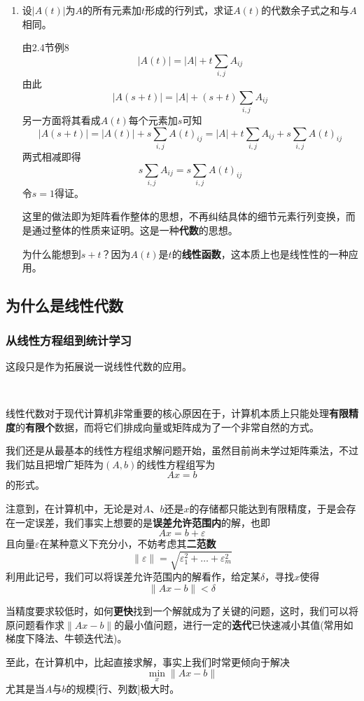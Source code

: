\documentclass[a4paper,UTF8,fontset=windows]{ctexart}
\newcommand*{\note}{\noindent *}
\begin{document}
\begin{enumerate}
    \item{}设$|A(t)|$为$A$的所有元素加$t$形成的行列式，求证$A(t)$的代数余子式之和与$A$相同。
    
    由2.4节例8
    $$|A(t)|=|A|+t\sum_{i,j}A_{ij}$$
    由此
    $$|A(s+t)|=|A|+(s+t)\sum_{i,j}A_{ij}$$
    另一方面将其看成$A(t)$每个元素加$s$可知
    $$|A(s+t)|=|A(t)|+s\sum_{i,j}A(t)_{ij}=|A|+t\sum_{i,j}A_{ij}+s\sum_{i,j}A(t)_{ij}$$
    两式相减即得
    $$s\sum_{i,j}A_{ij}=s\sum_{i,j}A(t)_{ij}$$
    令$s=1$得证。

    \note 这里的做法即为矩阵看作整体的思想，不再纠结具体的细节元素行列变换，而是通过整体的性质来证明。这是一种\textbf{代数}的思想。

    \note 为什么能想到$s+t$？因为$A(t)$是$t$的\textbf{线性函数}，这本质上也是线性性的一种应用。
\end{enumerate}

\subsection{为什么是线性代数}
\subsubsection{从线性方程组到统计学习}
\note 这段只是作为拓展说一说线性代数的应用。

\

线性代数对于现代计算机非常重要的核心原因在于，计算机本质上只能处理\textbf{有限精度}的\textbf{有限个}数据，而将它们排成向量或矩阵成为了一个非常自然的方式。

我们还是从最基本的线性方程组求解问题开始，虽然目前尚未学过矩阵乘法，不过我们姑且把增广矩阵为$(A,b)$的线性方程组写为
$$Ax=b$$
的形式。

注意到，在计算机中，无论是对$A$、$b$还是$x$的存储都只能达到有限精度，于是会存在一定误差，我们事实上想要的是\textbf{误差允许范围内}的解，也即
$$Ax=b+\varepsilon$$
且向量$\varepsilon$在某种意义下充分小，不妨考虑其\textbf{二范数}
$$\|\varepsilon\|=\sqrt{\varepsilon_1^2+\dots+\varepsilon_m^2}$$
利用此记号，我们可以将误差允许范围内的解看作，给定某$\delta$，寻找$x$使得
$$\|Ax-b\|<\delta$$

当精度要求较低时，如何\textbf{更快}找到一个解就成为了关键的问题，这时，我们可以将原问题看作求$\|Ax-b\|$的最小值问题，进行一定的\textbf{迭代}已快速减小其值(常用如梯度下降法、牛顿迭代法)。

至此，在计算机中，比起直接求解，事实上我们时常更倾向于解决
$$\min_x\|Ax-b\|$$
尤其是当$A$与$b$的规模[行、列数]极大时。
\end{document}
